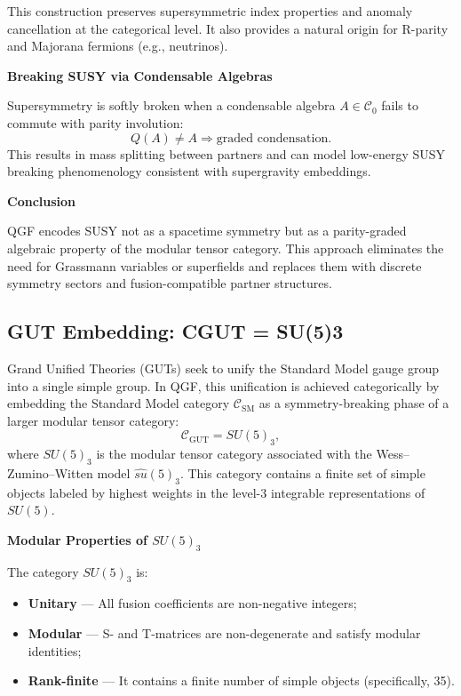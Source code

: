 \documentclass[11pt]{article}
\def\texorpdfstring#1#2{#2}
\begin{document}
This construction preserves supersymmetric index properties and anomaly cancellation at the categorical level. It also provides a natural origin for R-parity and Majorana fermions (e.g., neutrinos).

\vspace{0.5em}
\noindent\textbf{Breaking SUSY via Condensable Algebras}

Supersymmetry is softly broken when a condensable algebra \( A \in \mathcal{C}_0 \) fails to commute with parity involution:
\[
Q(A) \neq A \Rightarrow \text{graded condensation}.
\]
This results in mass splitting between partners and can model low-energy SUSY breaking phenomenology consistent with supergravity embeddings.

\vspace{0.5em}
\noindent\textbf{Conclusion}

QGF encodes SUSY not as a spacetime symmetry but as a parity-graded algebraic property of the modular tensor category. This approach eliminates the need for Grassmann variables or superfields and replaces them with discrete symmetry sectors and fusion-compatible partner structures.



\subsection{\texorpdfstring{GUT Embedding: \( \mathcal{C}_{\text{GUT}} = SU(5)_3 \)}{GUT Embedding: CGUT = SU(5)3}}


Grand Unified Theories (GUTs) seek to unify the Standard Model gauge group into a single simple group. In QGF, this unification is achieved categorically by embedding the Standard Model category \( \mathcal{C}_{\text{SM}} \) as a symmetry-breaking phase of a larger modular tensor category:
\[
\mathcal{C}_{\text{GUT}} = SU(5)_3,
\]
where \( SU(5)_3 \) is the modular tensor category associated with the Wess–Zumino–Witten model \( \widehat{su}(5)_3 \). This category contains a finite set of simple objects labeled by highest weights in the level-3 integrable representations of \( SU(5) \).

\vspace{0.5em}
\noindent\textbf{Modular Properties of \( SU(5)_3 \)}

The category \( SU(5)_3 \) is:
\begin{itemize}
  \item \textbf{Unitary} — All fusion coefficients are non-negative integers;
  \item \textbf{Modular} — S- and T-matrices are non-degenerate and satisfy modular identities;
  \item \textbf{Rank-finite} — It contains a finite number of simple objects (specifically, 35).
\end{itemize}
\end{document}
